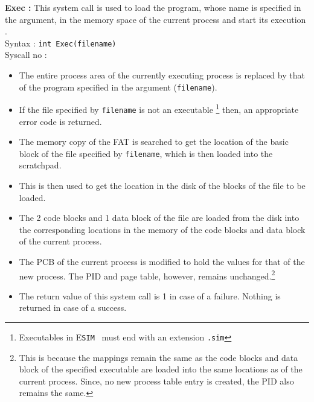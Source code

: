 \documentclass[10pt]{report}
\newcommand{\ESIM}{\textsc{E}\small{\texttt{SIM}}~}
\newcommand\counter[1]{\arabic{#1} \stepcounter{#1}}
\newcounter{syscall}
\begin{document}
\textbf{Exec :}  This system call is used to load the program, whose name is specified in the argument, in the memory space of the current process and start its execution .\\
Syntax : \texttt{int Exec(filename)} \\
Syscall no : \counter{syscall}
\begin{itemize}
	\item The entire process area of the currently executing process is replaced by that of the program specified in the argument (\texttt{filename}). 
	\item If the file specified by \texttt{filename} is not an executable \footnote{Executables in {\ESIM} must end with an extension \texttt{.sim}} then, an appropriate error code is returned.
	\item The memory copy of the FAT  is searched to get the location of the basic block of the file specified by \texttt{filename}, which is then loaded into the scratchpad.
	\item This is then used to get the location in the disk of the blocks of the file to be loaded.
	\item The 2 code blocks and 1 data block of the file are loaded from the disk into the corresponding locations in the memory of the code blocks and data block of the current process.
	\item The PCB of the current process is modified to hold the values for that of the new process. The PID and page table, however, remains unchanged.\footnote{This is because the mappings remain the same as the code blocks and data block of the specified executable are loaded into the same locations as of the current process. Since, no new process table entry is created, the PID also remains the same.}
	\item The return value of this system call is 1 in case of a failure. Nothing is returned in case of a success.
\end{itemize}
\end{document}
